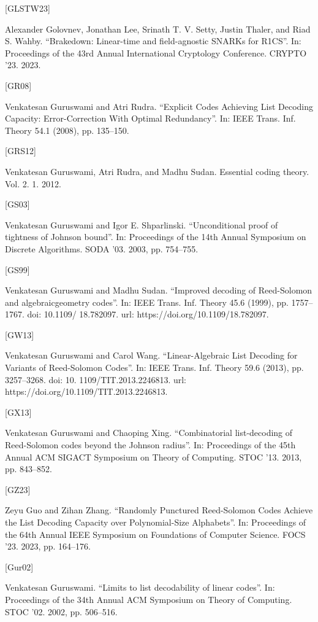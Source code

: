 \documentclass[11pt]{article}
\begin{document}
[GLSTW23]

Alexander Golovnev, Jonathan Lee, Srinath T. V. Setty, Justin Thaler, and Riad S. Wahby.
“Brakedown: Linear-time and field-agnostic SNARKs for R1CS”. In: Proceedings of the 43rd
Annual International Cryptology Conference. CRYPTO ’23. 2023.

[GR08]

Venkatesan Guruswami and Atri Rudra. “Explicit Codes Achieving List Decoding Capacity:
Error-Correction With Optimal Redundancy”. In: IEEE Trans. Inf. Theory 54.1 (2008),
pp. 135–150.

[GRS12]

Venkatesan Guruswami, Atri Rudra, and Madhu Sudan. Essential coding theory. Vol. 2. 1.
2012.

[GS03]

Venkatesan Guruswami and Igor E. Shparlinski. “Unconditional proof of tightness of Johnson bound”. In: Proceedings of the 14th Annual Symposium on Discrete Algorithms. SODA ’03.
2003, pp. 754–755.

[GS99]

Venkatesan Guruswami and Madhu Sudan. “Improved decoding of Reed-Solomon and algebraicgeometry codes”. In: IEEE Trans. Inf. Theory 45.6 (1999), pp. 1757–1767. doi: 10.1109/
18.782097. url: https://doi.org/10.1109/18.782097.

[GW13]

Venkatesan Guruswami and Carol Wang. “Linear-Algebraic List Decoding for Variants of
Reed-Solomon Codes”. In: IEEE Trans. Inf. Theory 59.6 (2013), pp. 3257–3268. doi: 10.
1109/TIT.2013.2246813. url: https://doi.org/10.1109/TIT.2013.2246813.

[GX13]

Venkatesan Guruswami and Chaoping Xing. “Combinatorial list-decoding of Reed-Solomon
codes beyond the Johnson radius”. In: Proceedings of the 45th Annual ACM SIGACT Symposium on Theory of Computing. STOC ’13. 2013, pp. 843–852.

[GZ23]

Zeyu Guo and Zihan Zhang. “Randomly Punctured Reed-Solomon Codes Achieve the List
Decoding Capacity over Polynomial-Size Alphabets”. In: Proceedings of the 64th Annual
IEEE Symposium on Foundations of Computer Science. FOCS ’23. 2023, pp. 164–176.

[Gur02]

Venkatesan Guruswami. “Limits to list decodability of linear codes”. In: Proceedings of the
34th Annual ACM Symposium on Theory of Computing. STOC ’02. 2002, pp. 506–516.
\end{document}
